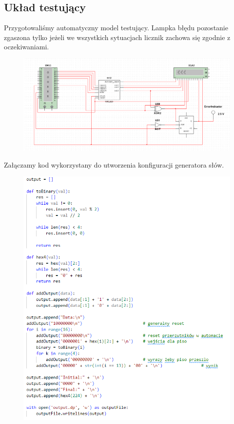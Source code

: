 \documentclass{article}
\begin{document}
\subsection{Układ testujący}
Przygotowaliśmy automatyczny model testujący. Lampka błędu pozostanie zgaszona tylko jeżeli we wszystkich sytuacjach licznik zachowa się zgodnie z oczekiwaniami.
\begin{figure}[H]
\includegraphics[width = \textwidth]{3b_tester}
\end{figure}
Załączamy kod wykorzystany do utworzenia konfiguracji generatora słów.
\begin{figure}[H]
\includegraphics[width = \textwidth]{3b_code}
\end{figure}
\end{document}
